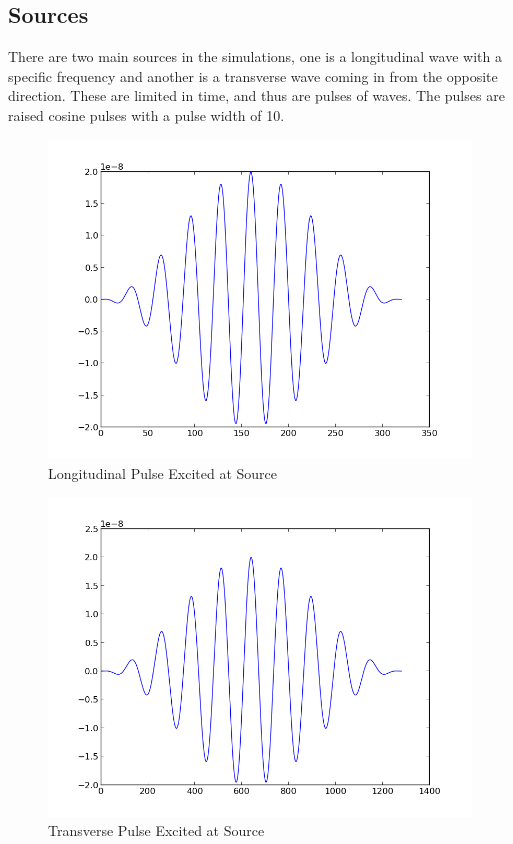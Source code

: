 \subsection{Sources}
There are two main sources in the simulations, one is a longitudinal wave with a specific frequency and another is a transverse wave coming in from the opposite direction. These are limited in time, and thus are pulses of waves. The pulses are raised cosine pulses with a pulse width of 10. 
\begin{figure}
\includegraphics[scale=0.5]{images/chapter_3/wave_1.png}
\caption{Longitudinal Pulse Excited at Source}
\end{figure}
\begin{figure}
\includegraphics[scale=0.5]{images/chapter_3/wave_2.png}
\caption{Transverse Pulse Excited at Source}
\end{figure}

